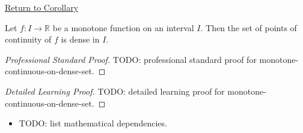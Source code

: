 \newpage
{}
\label{prf:monotone-continuous-on-dense-set}

\begin{remark*}[Return]
\hyperref[cor:monotone-continuous-on-dense-set]{Return to Corollary}
\end{remark*}

\begin{corollary*}
Let $f : I \to \mathbb{R}$ be a monotone function on an interval $I$. Then the set of points of continuity of $f$ is dense in $I$.
\end{corollary*}

\begin{proof}[Professional Standard Proof]
\LRAProofBodyStart
TODO: professional standard proof for monotone-continuous-on-dense-set.
\end{proof}

\begin{proof}[Detailed Learning Proof]
\LRAProofBodyStart
TODO: detailed learning proof for monotone-continuous-on-dense-set.
\end{proof}

\begin{remark*}
\end{remark*}

\begin{dependencies}
\begin{itemize}
  \item TODO: list mathematical dependencies.
\end{itemize}
\end{dependencies}

\clearpage
